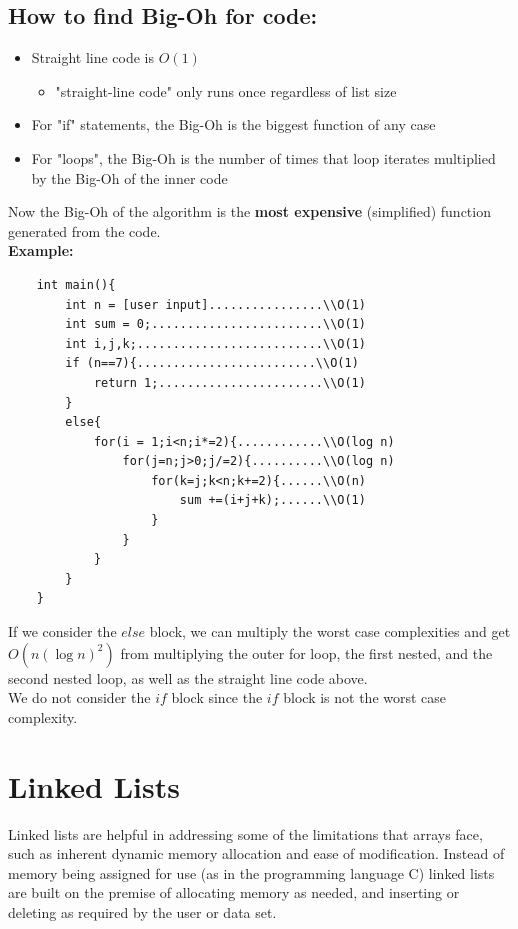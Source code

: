\documentclass[11pt]{article}
\begin{document}
\subsection{How to find Big-Oh for code:}
\begin{itemize}
    \item Straight line code is $O(1)$ 
    \begin{itemize}
        \item "straight-line code" only runs once regardless of list size
    \end{itemize}
    \item For "if" statements, the Big-Oh is the biggest function of any case
    \item For "loops", the Big-Oh is the number of times that loop iterates multiplied by the Big-Oh of the inner code
\end{itemize}
Now the Big-Oh of the algorithm is the \textbf{most expensive} (simplified) function generated from the code.\\[.5\baselineskip]
\textbf{Example:}
\begin{lstlisting}
    int main(){
        int n = [user input]................\\O(1)
        int sum = 0;........................\\O(1)
        int i,j,k;..........................\\O(1)
        if (n==7){.........................\\O(1)
            return 1;.......................\\O(1)
        }
        else{ 
            for(i = 1;i<n;i*=2){............\\O(log n)
                for(j=n;j>0;j/=2){..........\\O(log n)
                    for(k=j;k<n;k+=2){......\\O(n)
                        sum +=(i+j+k);......\\O(1)
                    }
                }
            }
        }
    }
\end{lstlisting}
If we consider the $else$ block, we can multiply the worst case complexities and get $O(n(\log n)^2)$ from multiplying the outer for loop, the first nested, and the second nested loop, as well as the straight line code above.\\[0.5\baselineskip]
We do not consider the $if$ block since the $if$ block is not the worst case complexity.
\section{Linked Lists}
Linked lists are helpful in addressing some of the limitations that arrays face, such as inherent dynamic memory allocation and ease of modification. Instead of memory being assigned for use (as in the programming language C) linked lists are built on the premise of allocating memory as needed, and inserting or deleting as required by the user or data set.
\end{document}

